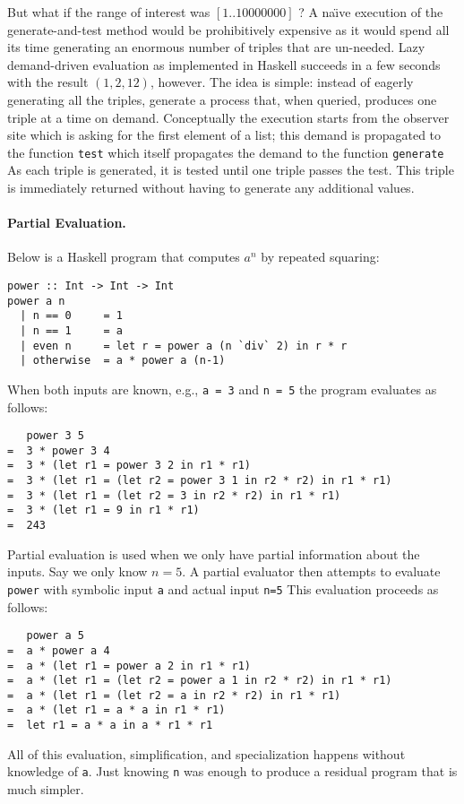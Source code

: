 \documentclass{article}
\newcommand{\h}[1]{\texttt{#1}}
\begin{document}
\begin{refsection}
But what if the range of interest was $[1..10000000]$ ? A na\"\i ve
execution of the generate-and-test method would be prohibitively
expensive as it would spend all its time generating an enormous number
of triples that are un-needed. Lazy demand-driven evaluation as
implemented in Haskell succeeds in a few seconds with the result
$(1,2,12)$, however. The idea is simple: instead of eagerly generating
all the triples, generate a process that, when queried, produces one
triple at a time on demand. Conceptually the execution starts from the
observer site which is asking for the first element of a list; this
demand is propagated to the function \h{test} which itself
propagates the demand to the function \h{generate}  As each triple
is generated, it is tested until one triple passes the test. This
triple is immediately returned without having to generate any
additional values.

\paragraph*{Partial Evaluation.}
Below is a Haskell program that computes $a^n$ by repeated squaring:
\begin{verbatim}
power :: Int -> Int -> Int
power a n
  | n == 0     = 1
  | n == 1     = a
  | even n     = let r = power a (n `div` 2) in r * r 
  | otherwise  = a * power a (n-1)
\end{verbatim}
When both inputs are known, e.g., \h{a = 3} and \h{n = 5}  the
program evaluates as follows:
\begin{verbatim}
   power 3 5
=  3 * power 3 4
=  3 * (let r1 = power 3 2 in r1 * r1)
=  3 * (let r1 = (let r2 = power 3 1 in r2 * r2) in r1 * r1)
=  3 * (let r1 = (let r2 = 3 in r2 * r2) in r1 * r1)
=  3 * (let r1 = 9 in r1 * r1)
=  243
\end{verbatim}

Partial evaluation is used when we only have partial information about
the inputs. Say we only know $n=5$. A partial evaluator then attempts
to evaluate \h{power} with symbolic input \h{a} and actual input
\h{n=5}  This evaluation proceeds as follows:
\begin{verbatim}
   power a 5 
=  a * power a 4 
=  a * (let r1 = power a 2 in r1 * r1)
=  a * (let r1 = (let r2 = power a 1 in r2 * r2) in r1 * r1)
=  a * (let r1 = (let r2 = a in r2 * r2) in r1 * r1)
=  a * (let r1 = a * a in r1 * r1)
=  let r1 = a * a in a * r1 * r1
\end{verbatim}
All of this evaluation, simplification, and specialization happens
without knowledge of \h{a}. Just knowing \h{n} was enough to
produce a residual program that is much simpler. 


\end{refsection}
\end{document}
